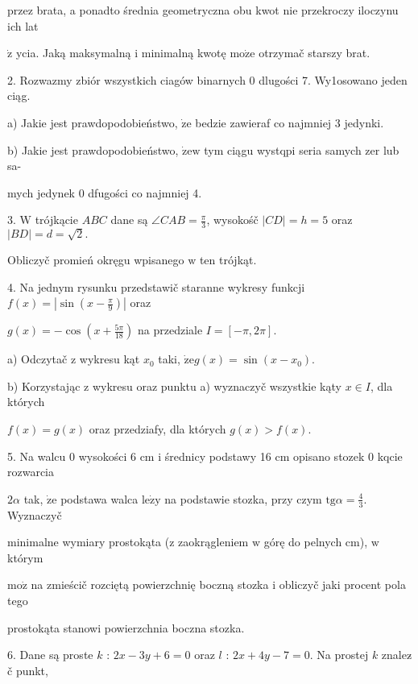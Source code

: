 \documentclass[a4paper,12pt]{article}
\begin{document}
przez brata, a ponadto średnia geometryczna obu kwot nie przekroczy iloczynu ich lat

$\dot{\mathrm{z}}$ ycia. Jaką maksymalną $\mathrm{i}$ minimalną kwotę $\mathrm{m}\mathrm{o}\dot{\mathrm{z}}\mathrm{e}$ otrzymač starszy brat.

2. Rozwazmy zbiór wszystkich ciagów binarnych $0$ dlugości 7. Wy1osowano jeden ciąg.

a) Jakie jest prawdopodobieństwo, $\dot{\mathrm{z}}\mathrm{e}$ bedzie zawieraf co najmniej 3 jedynki.

b) Jakie jest prawdopodobieństwo, $\dot{\mathrm{z}}\mathrm{e}\mathrm{w}$ tym ciągu wystqpi seria samych zer lub sa-

mych jedynek $0$ dfugości co najmniej 4.

3. $\mathrm{W}$ trójkącie $ABC$ dane są $\displaystyle \angle CAB=\frac{\pi}{3}$, wysokośč $|CD| =h=5$ oraz $|BD| =d=\sqrt{2}.$

Obliczyč promień okręgu wpisanego $\mathrm{w}$ ten trójkąt.

4. Na jednym rysunku przedstawič staranne wykresy funkcji $f(x) = |\displaystyle \sin(x-\frac{\pi}{9})|$ oraz

$g(x)=-\displaystyle \cos(x+\frac{5\pi}{18})$ na przedziale $I=[-\pi,2\pi].$

a) Odczytač $\mathrm{z}$ wykresu kąt $x_{0}$ taki, $\dot{\mathrm{z}}\mathrm{e}g(x)=\sin(x-x_{0}).$

b) Korzystając $\mathrm{z}$ wykresu oraz punktu a) wyznaczyč wszystkie kąty $x\in I$, dla których

$f(x)=g(x)$ oraz przedziafy, dla których $g(x)>f(x).$

5. Na walcu $0$ wysokości 6 cm $\mathrm{i}$ średnicy podstawy 16 cm opisano stozek $0$ kqcie rozwarcia

$ 2\alpha$ tak, $\dot{\mathrm{z}}\mathrm{e}$ podstawa walca $\mathrm{l}\mathrm{e}\dot{\mathrm{z}}\mathrm{y}$ na podstawie stozka, przy czym $\mathrm{t}\mathrm{g}\alpha= \displaystyle \frac{4}{3}$. Wyznaczyč

minimalne wymiary prostokąta ($\mathrm{z}$ zaokrągleniem $\mathrm{w}$ górę do pelnych cm), $\mathrm{w}$ którym

$\mathrm{m}\mathrm{o}\dot{\mathrm{z}}$ na zmieścič rozciętą powierzchnię boczną stozka $\mathrm{i}$ obliczyč jaki procent pola tego

prostokąta stanowi powierzchnia boczna stozka.

6. Dane są proste $k$ : $2x-3y+6=0$ oraz $l$ : $2x+4y-7=0$. Na prostej $k$ znalez$\acute{}$č punkt,
\end{document}
